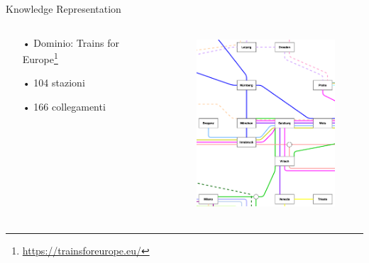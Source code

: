 \documentclass{beamer}
\begin{document}
    \begin{frame}{Knowledge Representation}

        \begin{columns}[c, onlytextwidth]
            \begin{column}{0.50\textwidth}

                \begin{itemize}
                    \item[•] Dominio: Trains for Europe\footnote{\url{https://trainsforeurope.eu/}}
                    \item[•] 104 stazioni
                    \item[•] 166 collegamenti
                \end{itemize}

            \end{column}

            \begin{column}{0.50\textwidth}
                \begin{figure}
                    \includegraphics[height=6.5cm]{figs/domain.png}
                \end{figure}
            \end{column}
        \end{columns}

    \end{frame}
\end{document}
